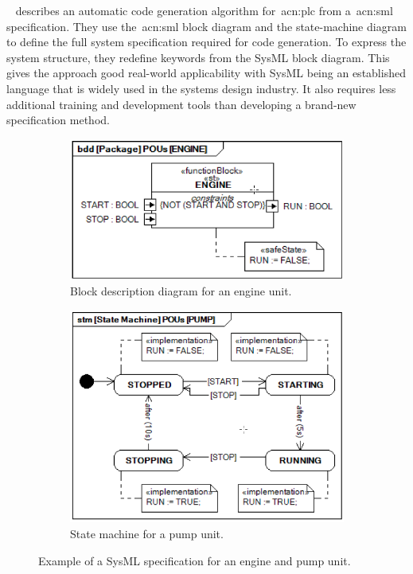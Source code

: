 \citeauthor{6957399}~\cite{6957399} describes an automatic code generation algorithm for~\acrshort{acn:plc} from a~\acrshort{acn:sml} specification.
They use the~\acrshort{acn:sml} block diagram and the state-machine diagram to define the full system specification required for code generation.
To express the system structure, they redefine keywords from the SysML block diagram.
This gives the approach good real-world applicability with SysML being an established language that is widely used in the systems design industry.
It also requires less additional training and development tools than developing a brand-new specification method.
\begin{figure}[h]
	\begin{subfigure}{0.5\textwidth}
		\includegraphics[width=\textwidth]{./Figures/sysml_bdd.png}
		\caption{Block description diagram for an engine unit.}
		\label{fig:sysml:bdd}
	\end{subfigure}
	\begin{subfigure}{0.5\textwidth}
		\includegraphics[width=\textwidth]{./Figures/sysml_stm.png}
		\caption{State machine for a pump unit.}
		\label{fig:sysml:stm}
	\end{subfigure}
	\caption[Example of a SysML specification for an engine and pump unit.]{Example of a SysML specification for an engine and pump unit.~\cite{6957399}}
\end{figure}
